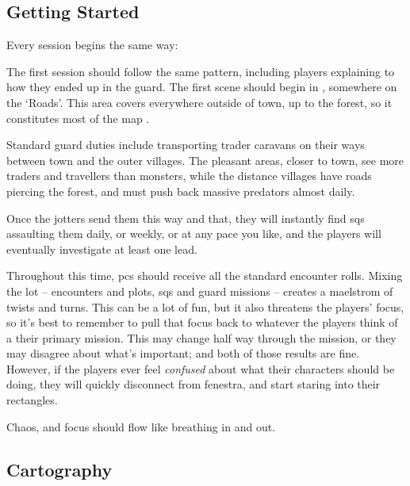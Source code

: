 \label{sqList}

\begin{multicols}{2}

\subsection{Getting Started}

Every session begins the same way:



The first session should follow the same pattern, including players explaining to  how they ended up in the \gls{guard}.
The first scene should begin in , somewhere on the `Roads'.
This area covers everywhere outside of \gls{town}, up to the forest, so it constitutes most of the map .

Standard \gls{guard} duties%
include transporting trader caravans on their ways between \gls{town} and the outer \glspl{village}.
The pleasant areas, closer to \gls{town}, see more traders and travellers than monsters, while the distance \glspl{village} have roads piercing the forest, and must push back massive predators almost daily.

Once the \glspl{jotter} send them this way and that, they will instantly find \glspl{sq} assaulting them daily, or weekly, or at any pace you like, and the players will eventually investigate at least one lead.

Throughout this time, \glspl{pc} should receive all the standard encounter rolls.
Mixing the lot -- encounters and plots, \glspl{sq} and \gls{guard} missions -- creates a maelstrom of twists and turns.
This can be a lot of fun, but it also threatens the players' focus, so it's best to remember to pull that focus back to whatever the players think of a their primary mission.
This may change half way through the mission, or they may disagree about what's important; and both of those results are fine.
However, if the players ever feel \emph{confused} about what their characters should be doing, they will quickly disconnect from \gls{fenestra}, and start staring into their rectangles.

Chaos, and focus should flow like breathing in and out.

\subsection{Cartography}


\end{multicols}

